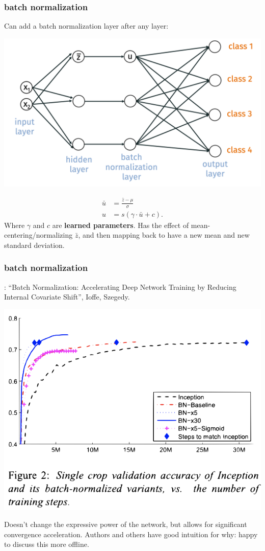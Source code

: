 \documentclass[handout,compress]{beamer}
\begin{document}
\begin{frame}
	\frametitle{batch normalization}
	\small Can add a batch normalization layer after any layer:
	\begin{center}
		\includegraphics[width=.6\textwidth]{batch_norm.png}
	\end{center}
	\vspace{-1em}
	\begin{align*}
	\bar{u} &= \frac{\bar{z} - \mu}{\sigma} \\
	u &= s(\gamma \cdot \bar{u} + c).
	\end{align*}
	Where $\gamma$ and $c$ are \textbf{learned parameters}. Has the effect of mean-centering/normalizing $\bar{z}$, and then mapping back to have a new mean and new standard deviation.
\end{frame}

\begin{frame}
	\frametitle{batch normalization}
	\small
	: ``Batch Normalization: Accelerating Deep Network Training by Reducing Internal Covariate Shift'', Ioffe, Szegedy.
	\begin{center}
		\includegraphics[width=.5\textwidth]{batch_norm_speed.png}
	\end{center}
	Doesn't change the expressive power of the network, but allows for significant convergence acceleration. Authors and others have good intuition for why: happy to discuss this more offline.
\end{frame}
\end{document}
